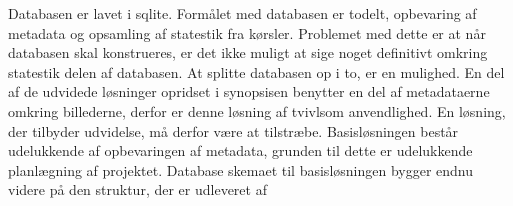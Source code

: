 Databasen er lavet i sqlite.
Formålet med databasen er todelt, opbevaring af metadata og opsamling af statestik fra kørsler.
Problemet med dette er at når databasen skal konstrueres, er det ikke muligt at sige noget definitivt omkring statestik delen af databasen.
At splitte databasen op i to, er en mulighed. 
En del af de udvidede løsninger opridset i synopsisen benytter en del af metadataerne omkring billederne, derfor er denne løsning af tvivlsom anvendlighed.
En løsning, der tilbyder udvidelse, må derfor være at tilstræbe.
Basisløsningen består udelukkende af opbevaringen af metadata, grunden til dette er udelukkende planlægning af projektet.
Database skemaet til basisløsningen bygger endnu videre på den struktur, der er udleveret af \cite{wgahu}
